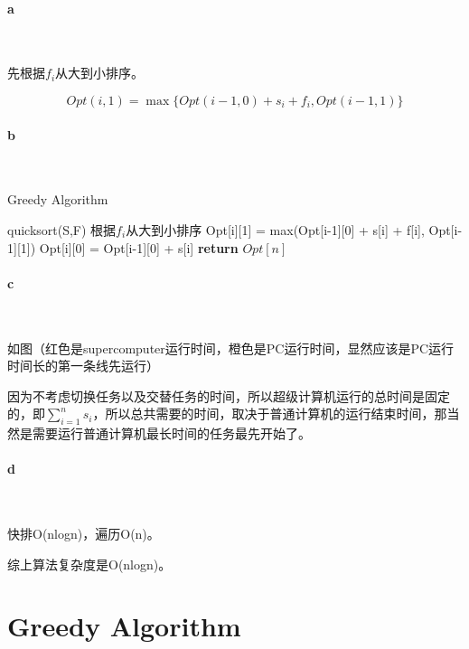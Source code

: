 \documentclass{article}
\begin{document}
		\paragraph{a}\
		
			先根据${f_i}$从大到小排序。
			
			\[Opt(i,1) = \max \{ Opt(i - 1,0) + {s_i} + {f_i},Opt(i - 1,1)\} \]
		\paragraph{b}\
			\begin{algorithm}
				\caption{Greedy Algorithm}
				\begin{algorithmic}
					\State quicksort(S,F)  \Comment 根据${f_i}$从大到小排序
					\State Opt[i][1] = max(Opt[i-1][0] + s[i] + f[i], Opt[i-1][1])
					\State Opt[i][0] = Opt[i-1][0] + s[i]
					\EndFor
					\State \textbf{return} $Opt[n]$
					\EndProcedure
				\end{algorithmic}
			\end{algorithm}
	
		\paragraph{c}\
		
		
			如图（红色是supercomputer运行时间，橙色是PC运行时间，显然应该是PC运行时间长的第一条线先运行）
			
			因为不考虑切换任务以及交替任务的时间，所以超级计算机运行的总时间是固定的，即$\sum\limits_{i = 1}^n {{s_i}}$，所以总共需要的时间，取决于普通计算机的运行结束时间，那当然是需要运行普通计算机最长时间的任务最先开始了。
			
		\paragraph{d}\
		
			快排O(nlogn)，遍历O(n)。
		
			综上算法复杂度是O(nlogn)。
	\color{mygreen} \section{Greedy Algorithm} \color{black}
\end{document}
